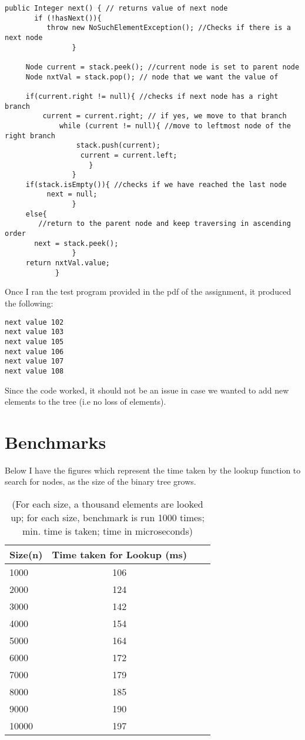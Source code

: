 \documentclass[a4paper,11pt]{article}
\begin{document}
\begin{verbatim}
public Integer next() { // returns value of next node
       if (!hasNext()){
          throw new NoSuchElementException(); //Checks if there is a next node
                }
        
     Node current = stack.peek(); //current node is set to parent node
     Node nxtVal = stack.pop(); // node that we want the value of 
                
     if(current.right != null){ //checks if next node has a right branch 
         current = current.right; // if yes, we move to that branch
             while (current != null){ //move to leftmost node of the right branch
                 stack.push(current);
                  current = current.left;
                    }
                }
     if(stack.isEmpty()){ //checks if we have reached the last node
          next = null;
                }
     else{
        //return to the parent node and keep traversing in ascending order
       next = stack.peek();
                }
     return nxtVal.value;
            }
\end{verbatim}

Once I ran the test program provided in the pdf of the assignment, it produced the following:

\begin{verbatim}
next value 102
next value 103
next value 105
next value 106
next value 107
next value 108
\end{verbatim}

Since the code worked, it should not be an issue in case we wanted to add new elements to the tree (i.e no loss of elements).


\section*{Benchmarks}
Below I have the figures which represent the time taken by the lookup function to search for nodes, as the size of the binary tree grows.

\begin{table}[h]
\begin{center}
\begin{tabular}{l|c|c|c}
\textbf{Size(n)} & \textbf{Time taken for Lookup (ms)}\\
\hline
  1000      &  106\\
  2000      &  124\\
  3000      &  142\\
  4000      &  154\\
  5000      &  164\\
  6000      &  172\\
  7000      &  179\\
  8000      &  185\\
  9000      &  190\\
  10000      &  197\\
\end{tabular}
\caption{(For each size, a thousand elements are looked up; for each size, benchmark is run 1000 times; min. time is taken; time in microseconds)}
\label{tab:table1}
\end{center}
\end{table}
\end{document}

